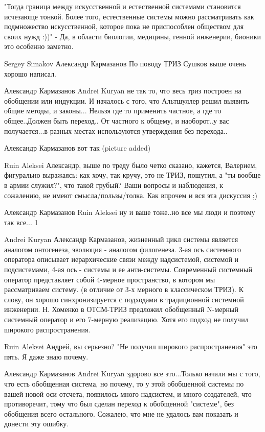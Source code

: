 \documentclass[11pt,a4paper]{article}
\begin{document}
"Тогда граница между искусственной и естественной системами становится
исчезающе тонкой. Более того, естественные системы можно рассматривать как
подмножество искусственной, которое пока не приспособлен обществом для своих
нужд :))" - Да, в области биологии, медицины, генной инженерии, бионики это
особенно заметно.

Sergey Simakov Александр Кармазанов По поводу ТРИЗ Сушков выше очень хорошо
написал.

Александр Кармазанов Andrei Kuryan не так то, что весь триз построен на
обобщении или индукции. И началось с того, что Альтшуллер решил выявить общие
методы, и законы...  Нельзя где то применить частное, а где то общее..Должен
быть переход..  От частного к общему, и наоборот..у вас получается...в разных
местах используются утверждения без перехода..

Александр Кармазанов вот так (picture added)

Ruin Aleksei Александр, выше по треду было четко сказано, кажется, Валерием,
фигурально выражаясь: как хочу, так кручу, это не ТРИЗ, пошутил, а "ты вообще
в армии служил?", что такой грубый? Ваши вопросы и наблюдения, к сожалению, не
имеют смысла/пользы/толка. Как впрочем и вся эта дискуссия ;)

Александр Кармазанов Ruin Aleksei ну и ваше тоже..но все мы люди и поэтому так
все...  1

Andrei Kuryan Александр Кармазанов, жизненный цикл системы является аналогом
онтогенеза, эволюция - аналогом филогенеза. 3-ая ось системного оператора
описывает иерархические связи между надсистемой, системой и подсистемами, 4-ая
ось - системы и ее анти-системы.  Современный системный оператор представляет
собой 4-мерное пространство, в котором мы рассматриваем систему. (в отличие от
3-х мерного в классическом ТРИЗ). К слову, он хорошо синхронизируется с
подходами в традиционной системной инженерии.  Н. Хоменко в ОТСМ-ТРИЗ
предложил обобщенный N-мерный системный оператор и его 7-мерную
реализацию. Хотя его подход не получил широкого распространения.

Ruin Aleksei Андрей, вы серьезно? "Не получил широкого распространения" это
пять. Я даже знаю почему.

Александр Кармазанов Andrei Kuryan здорово все это...Только начали мы с того,
что есть обобщенная система, но почему, то у этой обобщенной системы по вашей
новой оси отсчета, появилось много надсистем, и много создателей, что
противоречит, тому что был сделан переход к обобщенной "системе", без
обобщения всего остального. Сожалею, что мне не удалось вам показать и донести
эту ошибку.
\end{document}
